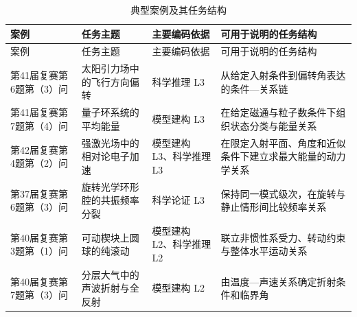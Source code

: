 \documentclass[
  12pt,
  a4paper]{ctexbook}
\begin{document}
\begin{longtable}[]{@{}
  >{\raggedright\arraybackslash}p{}
  >{\raggedright\arraybackslash}p{}
  >{\raggedright\arraybackslash}p{}
  >{\raggedright\arraybackslash}p{}@{}}
\caption{典型案例及其任务结构}\tabularnewline
\toprule\noalign{}
\rowcolor{ThesisPale}
\begin{minipage}[b]{\linewidth}\raggedright
案例
\end{minipage} & \begin{minipage}[b]{\linewidth}\raggedright
任务主题
\end{minipage} & \begin{minipage}[b]{\linewidth}\raggedright
主要编码依据
\end{minipage} & \begin{minipage}[b]{\linewidth}\raggedright
可用于说明的任务结构
\end{minipage} \\
\midrule\noalign{}
\endfirsthead
\toprule\noalign{}
\rowcolor{ThesisPale}
\begin{minipage}[b]{\linewidth}\raggedright
案例
\end{minipage} & \begin{minipage}[b]{\linewidth}\raggedright
任务主题
\end{minipage} & \begin{minipage}[b]{\linewidth}\raggedright
主要编码依据
\end{minipage} & \begin{minipage}[b]{\linewidth}\raggedright
可用于说明的任务结构
\end{minipage} \\
\midrule\noalign{}
\endhead
\bottomrule\noalign{}
\endlastfoot
第41届复赛第6题第（3）问 & 太阳引力场中的飞行方向偏转 & 科学推理 L3 &
从给定入射条件到偏转角表达的条件---关系链 \\
第41届复赛第7题第（4）问 & 量子环系统的平均能量 & 模型建构 L3 &
在给定磁通与粒子数条件下组织状态分类与能量关系 \\
第42届复赛第4题第（2）问 & 强激光场中的相对论电子加速 & 模型建构
L3、科学推理 L3 &
在限定入射平面、角度和近似条件下建立求最大能量的动力学关系 \\
第37届复赛第6题第（3）问 & 旋转光学环形腔的共振频率分裂 & 科学论证 L3 &
保持同一模式级次，在旋转与静止情形间比较频率关系 \\
第40届复赛第3题第（1）问 & 可动楔块上圆球的纯滚动 & 模型建构
L2、科学推理 L2 & 联立非惯性系受力、转动约束与整体水平运动关系 \\
第40届复赛第7题第（3）问 & 分层大气中的声波折射与全反射 & 模型建构 L2 &
由温度---声速关系确定折射条件和临界角 \\
\end{longtable}
\end{document}

